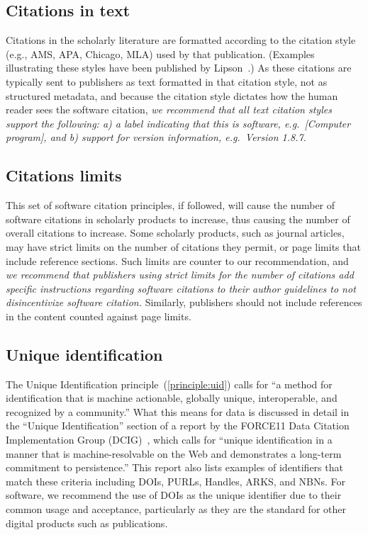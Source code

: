 \documentclass[11pt, oneside]{amsart}
\begin{document}
\subsection{Citations in text}

Citations in the scholarly literature are formatted according to the citation style (e.g., AMS, APA, Chicago, MLA) used by that publication. (Examples illustrating these styles have been published by Lipson~\cite{lipson2011cite}.)  As these citations are typically sent to publishers as text formatted in that citation style, not as structured metadata, and because the citation style dictates how the human reader sees the software citation, \textit{we recommend that all text citation styles support the following:
a) a label indicating that this is software, e.g.\ [Computer program], and b) support for version information, e.g.\ Version 1.8.7.}

\subsection{Citations limits}

This set of software citation principles, if followed, will cause the number of software citations in scholarly products to increase, thus causing the number of overall citations to increase. Some scholarly products, such as journal articles, may have strict limits on the number of citations they permit, or page limits that include reference sections. Such limits are counter to our recommendation, and \textit{we recommend that publishers using strict limits for the number of citations add specific instructions regarding software citations to their author guidelines to not disincentivize software citation.} Similarly, publishers should not include references in the content counted against page
limits.

\subsection{Unique identification}

The Unique Identification principle~(\ref{principle:uid}) calls for ``a method for identification that is machine actionable, globally unique, interoperable, and recognized by a community.''
What this means for data is discussed in detail in the ``Unique Identification'' section of a report by the FORCE11 Data Citation Implementation Group (DCIG)~\cite{10.7717/peerj-cs.1}, which calls for ``unique identification in a manner that is machine-resolvable on the Web and demonstrates a long-term commitment to persistence.''
This report also lists examples of identifiers that match these criteria including DOIs, PURLs, Handles, ARKS, and NBNs.
For software, we recommend the use of DOIs as the unique identifier due to their common usage and acceptance, particularly as they are the standard for other digital products such as publications.
\end{document}
